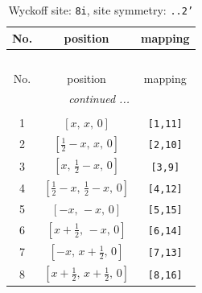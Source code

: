 \documentclass[fleqn,8pt]{jsarticle}
\begin{document}
\renewcommand{\arraystretch}{1.2}
\begin{longtable}{ccc}
\caption{Wyckoff site: {\tt 8i}, site symmetry: {\tt ..2'}}
 \\
 \hline \hline
No. & position & mapping \\ \hline \endfirsthead

\multicolumn{2}{l}{\tablename\ \thetable{}} \\
 \hline \hline
No. & position & mapping \\ \hline \endhead

 \hline \hline
\multicolumn{2}{r}{\footnotesize\it continued ...} \\ \endfoot

 \hline \hline
\multicolumn{2}{r}{} \\ \endlastfoot

1 & $\left[ x,\, x,\, 0 \right]$ & {\tt [1,11]} \\ \hline
2 & $\left[ \frac{1}{2} - x,\, x,\, 0 \right]$ & {\tt [2,10]} \\ \hline
3 & $\left[ x,\, \frac{1}{2} - x,\, 0 \right]$ & {\tt [3,9]} \\ \hline
4 & $\left[ \frac{1}{2} - x,\, \frac{1}{2} - x,\, 0 \right]$ & {\tt [4,12]} \\ \hline
5 & $\left[ - x,\, - x,\, 0 \right]$ & {\tt [5,15]} \\ \hline
6 & $\left[ x + \frac{1}{2},\, - x,\, 0 \right]$ & {\tt [6,14]} \\ \hline
7 & $\left[ - x,\, x + \frac{1}{2},\, 0 \right]$ & {\tt [7,13]} \\ \hline
8 & $\left[ x + \frac{1}{2},\, x + \frac{1}{2},\, 0 \right]$ & {\tt [8,16]} \\
\end{longtable}
\renewcommand{\arraystretch}{1.2}
\end{document}

